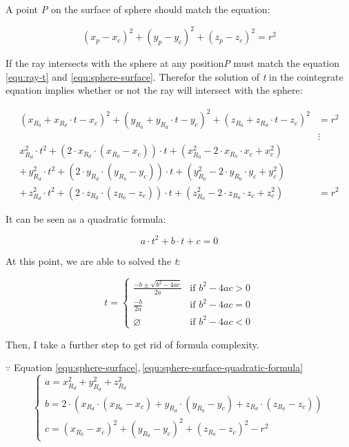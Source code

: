 A point \emph{P} on the surface of sphere should match the equation:

\begin{equation}\label{equ:sphere-surface}
(x_p - x_c)^2 + (y_p - y_c)^2 + (z_p - z_c)^2 = r^2
\end{equation}

If the ray intersects with the sphere at any position\emph{P} must match the equation \ref{equ:ray-t} and \ref{equ:sphere-surface}. Therefor the solution of \emph{t} in the cointegrate equation implies whether or not the ray will intersect with the sphere:

\[
\begin{aligned}
(x_{R_0} + x_{R_d} \cdot t - x_c)^2 + (y_{R_0} + y_{R_d} \cdot t - y_c)^2 + (z_{R_0} + z_{R_d} \cdot t - z_c)^2 &= r^2 \\
&\vdots \\
x_{R_d}^2 \cdot t^2 + (2 \cdot x_{R_d} \cdot (x_{R_0} - x_c)) \cdot t + (x_{R_0}^2 - 2 \cdot x_{R_0}\cdot x_c + x_c^2) & \\
+\,y_{R_d}^2 \cdot t^2 + (2 \cdot y_{R_d} \cdot (y_{R_0} - y_c)) \cdot t + (y_{R_0}^2 - 2 \cdot y_{R_0}\cdot y_c + y_c^2) & \\
+\,z_{R_d}^2 \cdot t^2 + (2 \cdot z_{R_d} \cdot (z_{R_0} - z_c)) \cdot t + (z_{R_0}^2 - 2 \cdot z_{R_0}\cdot z_c + z_c^2) &= r^2
\end{aligned}
\]

It can be seen as a quadratic formula:

\begin{equation}\label{equ:sphere-surface-quadratic-formula}
a \cdot t^2 + b \cdot t + c = 0
\end{equation}

At this point, we are able to solved the \emph{t}:

\[
t =
\begin{cases}
\frac{-b \pm \sqrt{b^2 - 4ac}}{2a} & \text{if } b^2 - 4ac > 0 \\
\frac{-b}{2a} & \text{if } b^2 - 4ac = 0 \\
\varnothing & \text{if } b^2 - 4ac < 0
\end{cases}
\]

Then, I take a further step to get rid of formula complexity.

$\because$ Equation \ref{equ:sphere-surface},\,\ref{equ:sphere-surface-quadratic-formula}
\[
\left\{
\begin{array}{lr}
a = x_{R_d}^2 + y_{R_d}^2 + z_{R_d}^2 \\
b = 2 \cdot (x_{R_d} \cdot (x_{R_0} - x_c) + y_{R_d} \cdot (y_{R_0} - y_c) + z_{R_d} \cdot (z_{R_0} - z_c)) \\
c = (x_{R_0} - x_c)^2 + (y_{R_0} - y_c)^2 + (z_{R_0} - z_c)^2 - r^2
\end{array}
\right.
\]


